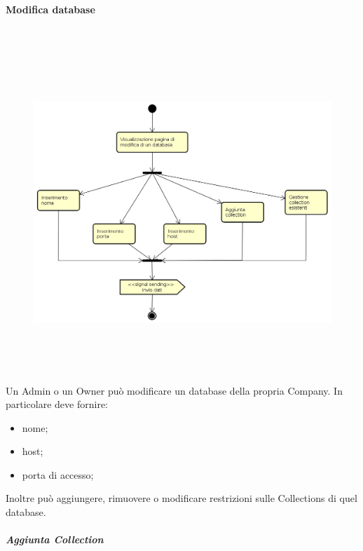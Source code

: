 \paragraph{Modifica database} \mbox{} \\
\begin{figure}[H]
\begin{center}
\includegraphics[height=12cm]{res/sections/backend/activities/modificaDatabase.png}
\end{center}
\end{figure}
Un Admin o un Owner può modificare un database della propria Company. In particolare deve fornire:
\begin{itemize}
\item nome;
\item host;
\item porta di accesso;
\end{itemize}
Inoltre può aggiungere, rimuovere o modificare restrizioni sulle Collections di quel database.
\subparagraph{Aggiunta Collection} \mbox{} \\

